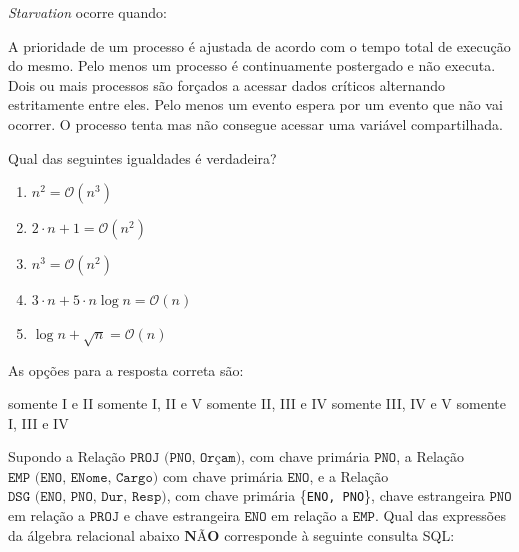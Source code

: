 \documentclass[12pt, addpoints]{exam}
\begin{document}
    \begin{questions}

    \newpage
    \question
\textit{Starvation} ocorre quando:
\begin{choices}
\choice A prioridade de um processo é ajustada de acordo com o tempo total de execução do mesmo.
\choice Pelo menos um processo é continuamente postergado e não executa.
\choice Dois ou mais processos são forçados a acessar dados críticos alternando estritamente entre eles.
\choice Pelo menos um evento espera por um evento que não vai ocorrer.
\choice O processo tenta mas não consegue acessar uma variável compartilhada.
\end{choices}

\question
Qual das seguintes igualdades é verdadeira?

\begin{enumerate}
    \item[(I)] \( n^2 = \mathcal{O}(n^3) \)
    \item[(II)] \( 2 \cdot n + 1 = \mathcal{O}(n^2) \)
    \item[(III)] \( n^3 = \mathcal{O}(n^2) \)
    \item[(IV)] \( 3 \cdot n + 5 \cdot n \log n = \mathcal{O}(n) \)
    \item[(V)] \( \log n + \sqrt{n} = \mathcal{O}(n) \)
\end{enumerate}

As opções para a resposta correta são:
\begin{choices}
\choice somente I e II
\choice somente I, II e V
\choice somente II, III e IV
\choice somente III, IV e V
\choice somente I, III e IV
\end{choices}

\question
Supondo a Relação $\texttt{PROJ (PNO, Orçam)}$, com chave primária $\texttt{PNO}$, a Relação $\texttt{EMP (ENO, ENome, Cargo)}$ com chave primária $\texttt{ENO}$, e a Relação $\texttt{DSG (ENO, PNO, Dur, Resp)}$, com chave primária \{\texttt{ENO, PNO}\}, chave estrangeira $\texttt{PNO}$ em relação a $\texttt{PROJ}$ e chave estrangeira $\texttt{ENO}$ em relação a $\texttt{EMP}$. Qual das expressões da álgebra relacional abaixo $\textbf{NÃO}$ corresponde à seguinte consulta SQL:


\end{questions}
\end{document}

